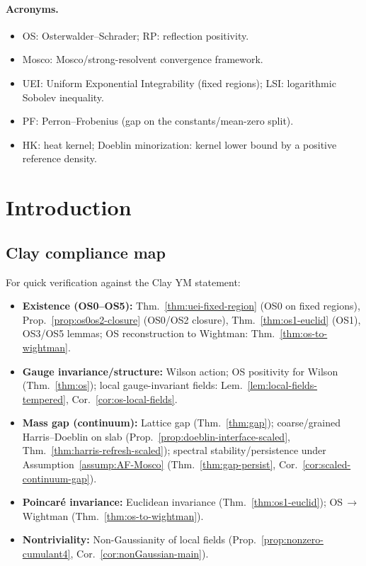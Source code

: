 \documentclass[11pt]{amsart}
\theoremstyle{plain}
\theoremstyle{definition}
\theoremstyle{remark}
\begin{document}
\paragraph{Acronyms.}
\begin{itemize}
  \item OS: Osterwalder--Schrader; RP: reflection positivity.
  \item Mosco: Mosco/strong-resolvent convergence framework.
  \item UEI: Uniform Exponential Integrability (fixed regions); LSI: logarithmic Sobolev inequality.
  \item PF: Perron--Frobenius (gap on the constants/mean-zero split).
  \item HK: heat kernel; Doeblin minorization: kernel lower bound by a positive reference density.
\end{itemize}

\section{Introduction}
\subsection*{Clay compliance map}
For quick verification against the Clay YM statement:
\begin{itemize}
  \item \textbf{Existence (OS0--OS5):} Thm.~\ref{thm:uei-fixed-region} (OS0 on fixed regions), Prop.~\ref{prop:os0os2-closure} (OS0/OS2 closure), Thm.~\ref{thm:os1-euclid} (OS1), OS3/OS5 lemmas; OS reconstruction to Wightman: Thm.~\ref{thm:os-to-wightman}.
  \item \textbf{Gauge invariance/structure:} Wilson action; OS positivity for Wilson (Thm.~\ref{thm:os}); local gauge-invariant fields: Lem.~\ref{lem:local-fields-tempered}, Cor.~\ref{cor:os-local-fields}.
  \item \textbf{Mass gap (continuum):} Lattice gap (Thm.~\ref{thm:gap}); coarse/grained Harris--Doeblin on slab (Prop.~\ref{prop:doeblin-interface-scaled}, Thm.~\ref{thm:harris-refresh-scaled}); spectral stability/persistence under Assumption~\ref{assump:AF-Mosco} (Thm.~\ref{thm:gap-persist}, Cor.~\ref{cor:scaled-continuum-gap}).
  \item \textbf{Poincar\'e invariance:} Euclidean invariance (Thm.~\ref{thm:os1-euclid}); OS\,$\to$\,Wightman (Thm.~\ref{thm:os-to-wightman}).
  \item \textbf{Nontriviality:} Non-Gaussianity of local fields (Prop.~\ref{prop:nonzero-cumulant4}, Cor.~\ref{cor:nonGaussian-main}).
\end{itemize}
\end{document}
